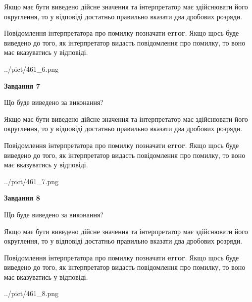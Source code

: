\documentclass[12pt, ukrainian]{article}
\begin{document}
{\begin {Large}
Якщо має бути виведено дійсне значення та інтерпретатор має здійснювати його округлення, 
то у відповіді достатньо правильно вказати два дробових розряди.

Повідомлення інтерпретатора про помилку позначати \textbf{error}.
Якщо щось буде виведено до того, як інтерпретатор видасть повідомлення про помилку, 
то воно має вказуватись у відповіді. \par

\begin{center}
	{../pict/461_6.png}
\end{center}
\newpage

{\begin {center}\textbf{Завдання 7}\end {center}}\par
Що буде виведено за виконання? \par

Якщо має бути виведено дійсне значення та інтерпретатор має здійснювати його округлення, 
то у відповіді достатньо правильно вказати два дробових розряди.

Повідомлення інтерпретатора про помилку позначати \textbf{error}.
Якщо щось буде виведено до того, як інтерпретатор видасть повідомлення про помилку, 
то воно має вказуватись у відповіді. \par

\begin{center}
	{../pict/461_7.png}
\end{center}
\newpage

{\begin {center}\textbf{Завдання 8}\end {center}}\par
Що буде виведено за виконання? \par

Якщо має бути виведено дійсне значення та інтерпретатор має здійснювати його округлення, 
то у відповіді достатньо правильно вказати два дробових розряди.

Повідомлення інтерпретатора про помилку позначати \textbf{error}.
Якщо щось буде виведено до того, як інтерпретатор видасть повідомлення про помилку, 
то воно має вказуватись у відповіді. \par

\begin{center}
	{../pict/461_8.png}
\end{center}
\newpage


\end{Large}}
\end{document}
